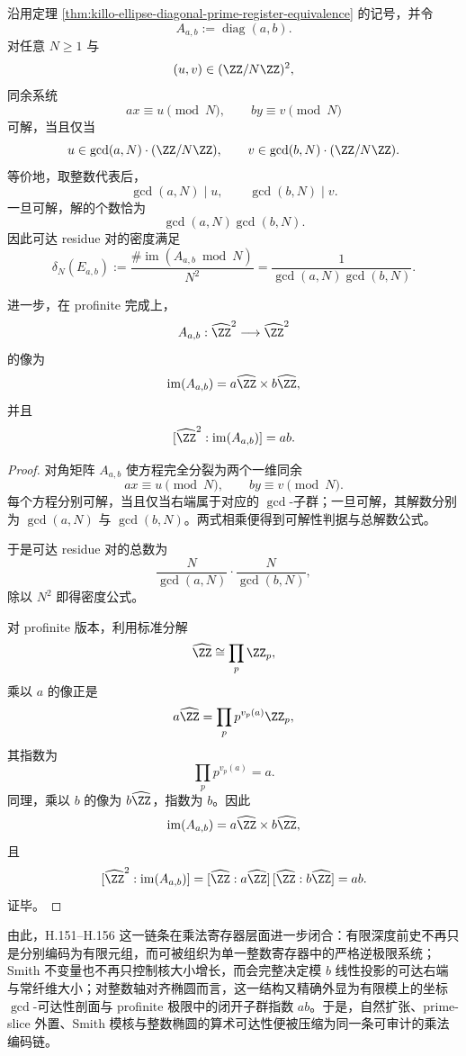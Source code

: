 \begin{corollary}\label{cor:xi-time-part53ac-integer-ellipse-local-global-profinite-index}
沿用定理 \ref{thm:killo-ellipse-diagonal-prime-register-equivalence} 的记号，并令
\[
A_{a,b}:=\operatorname{diag}(a,b).
\]
对任意 \(N\ge 1\) 与
\[
(u,v)\in (\ZZ/N\ZZ)^2,
\]
同余系统
\[
ax\equiv u\pmod N,
\qquad
by\equiv v\pmod N
\]
可解，当且仅当
\[
u\in \gcd(a,N)\cdot (\ZZ/N\ZZ),
\qquad
v\in \gcd(b,N)\cdot (\ZZ/N\ZZ).
\]
等价地，取整数代表后，
\[
\gcd(a,N)\mid u,
\qquad
\gcd(b,N)\mid v.
\]
一旦可解，解的个数恰为
\[
\gcd(a,N)\gcd(b,N).
\]
因此可达 residue 对的密度满足
\[
\delta_N(E_{a,b})
:=
\frac{\#\operatorname{im}(A_{a,b}\bmod N)}{N^2}
=
\frac{1}{\gcd(a,N)\gcd(b,N)}.
\]

进一步，在 profinite 完成上，
\[
A_{a,b}:\widehat{\ZZ}^2\longrightarrow \widehat{\ZZ}^2
\]
的像为
\[
\operatorname{im}(A_{a,b})
=
a\widehat{\ZZ}\times b\widehat{\ZZ},
\]
并且
\[
[\widehat{\ZZ}^2:\operatorname{im}(A_{a,b})]=ab.
\]
\end{corollary}
\begin{proof}
对角矩阵 \(A_{a,b}\) 使方程完全分裂为两个一维同余
\[
ax\equiv u\pmod N,
\qquad
by\equiv v\pmod N.
\]
每个方程分别可解，当且仅当右端属于对应的 \(\gcd\)-子群；一旦可解，其解数分别为 \(\gcd(a,N)\) 与 \(\gcd(b,N)\)。两式相乘便得到可解性判据与总解数公式。

于是可达 residue 对的总数为
\[
\frac{N}{\gcd(a,N)}\cdot \frac{N}{\gcd(b,N)},
\]
除以 \(N^2\) 即得密度公式。

对 profinite 版本，利用标准分解
\[
\widehat{\ZZ}\cong \prod_{p}\ZZ_p,
\]
乘以 \(a\) 的像正是
\[
a\widehat{\ZZ}=\prod_{p}p^{v_p(a)}\ZZ_p,
\]
其指数为
\[
\prod_{p}p^{v_p(a)}=a.
\]
同理，乘以 \(b\) 的像为 \(b\widehat{\ZZ}\)，指数为 \(b\)。因此
\[
\operatorname{im}(A_{a,b})=a\widehat{\ZZ}\times b\widehat{\ZZ},
\]
且
\[
[\widehat{\ZZ}^2:\operatorname{im}(A_{a,b})]
=
[\widehat{\ZZ}:a\widehat{\ZZ}]\,[\widehat{\ZZ}:b\widehat{\ZZ}]
=
ab.
\]
证毕。
\end{proof}

\noindent
由此，H.151--H.156 这一链条在乘法寄存器层面进一步闭合：有限深度前史不再只是分别编码为有限元组，而可被组织为单一整数寄存器中的严格逆极限系统；Smith 不变量也不再只控制核大小增长，而会完整决定模 \(b\) 线性投影的可达右端与常纤维大小；对整数轴对齐椭圆而言，这一结构又精确外显为有限模上的坐标 \(\gcd\)-可达性剖面与 profinite 极限中的闭开子群指数 \(ab\)。于是，自然扩张、prime-slice 外置、Smith 模核与整数椭圆的算术可达性便被压缩为同一条可审计的乘法编码链。

\endinput
